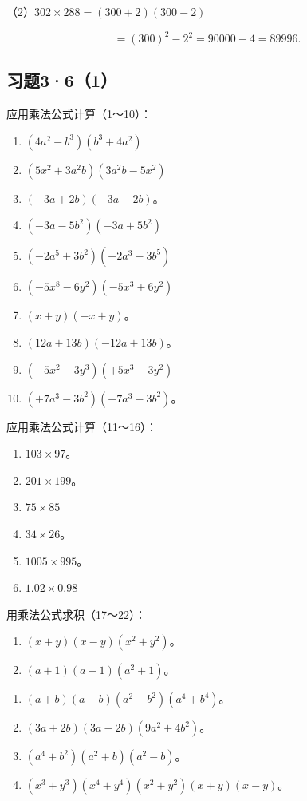 （2）\(302 \times 288 = (300 + 2)(300 - 2)\)

\[
= (300) ^{2} - 2 ^{2} = 90000 - 4 = 89996.
\]

\subsection{习题3·6（1）}

应用乘法公式计算（1～10）：

\begin{enumerate}[start=1]
\item
  \((4a^{2} - b^{3})(b^{3} + 4a^{2})\)
\item
  \((5x^{2} + 3a^{2}b)(3a^{2}b - 5x^{2})\)
\item
  \((-3a + 2b)(-3a - 2b)\)。
\item
  \((-3a - 5b^{2})(-3a + 5b^{2})\)
\item
  \((-2a^{5} + 3b^{2})(-2a^{3} - 3b^{5})\)
\item
  \((-5x^{8} - 6y^{2})(-5x^{3} + 6y^{2})\)
\item
  \((x + y)(-x + y)\)。
\item
  \((12a + 13b)(-12a + 13b)\)。
\item
  \((-5x^{2} - 3y^{3})(+5x^{3} - 3y^{2})\)
\item
  \((+7a^{3} - 3b^{2})(-7a^{3} - 3b^{2})\)。
\end{enumerate}

应用乘法公式计算（11～16）：

\begin{enumerate}[start=11]
\item
  \(103 \times 97\)。
\item
  \(201 \times 199\)。
\item
  \(75 \times 85\)
\item
  \(34 \times 26\)。
\item
  \(1005 \times 995\)。
\item
  \(1.02 \times 0.98\)
\end{enumerate}

用乘法公式求积（17～22）：

\begin{enumerate}[start=17]
\item
  \((x + y)(x - y)(x^2 + y^2)\)。
\item
  \((a + 1)(a - 1)(a^2 + 1)\)。
\end{enumerate}

\begin{enumerate}[start=19]
\item
  \((a + b)(a - b)(a^2 + b^2)(a^4 + b^4)\)。
\item
  \((3a + 2b)(3a - 2b)(9a^2 + 4b^2)\)。
\item
  \((a^4 + b^2)(a^2 + b)(a^2 - b)\)。
\item
  \((x^{3} + y^{3})(x^{4} + y^{4})(x^{2} + y^{2})(x + y)(x - y)\)。
\end{enumerate}

